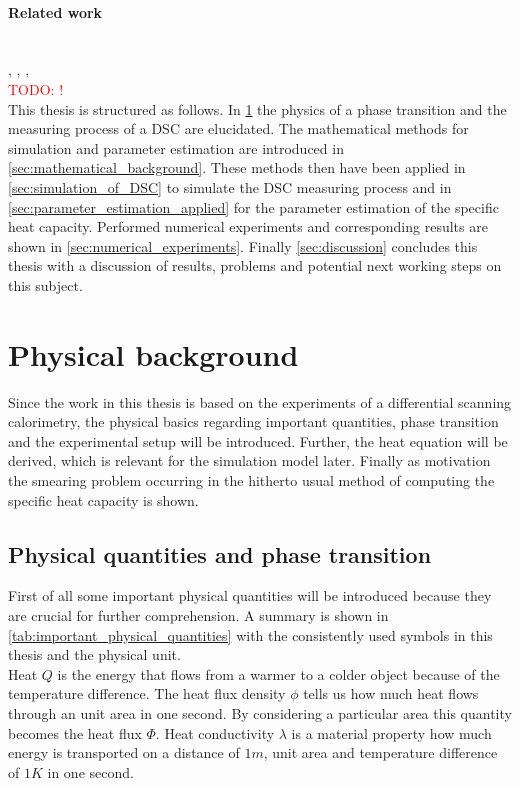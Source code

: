 \documentclass{scrartcl}[12pt, halfparskip]
\numberwithin{equation}{section}
\numberwithin{figure}{section}
\numberwithin{table}{section}
\newcommand{\todo}[1]{\textcolor{red}{TODO: #1}}
\begin{document}
\paragraph{Related work} \mbox{}\\
\cite{wunderlich_thermal_analysis}, \cite{standardization_of_PCM}, 
\cite{diss_DSC}, \cite{fokker_planck_desmearing_asommer} \\

\todo{!} \\

This thesis is structured as follows. In \cref{sec:physical_background} the physics of a phase transition and the measuring process of a DSC are elucidated. 
The mathematical methods for simulation and parameter estimation are introduced in \cref{sec:mathematical_background}. These methods then have been applied in \cref{sec:simulation_of_DSC} to simulate the DSC measuring process and in \cref{sec:parameter_estimation_applied} for the parameter estimation of the specific heat capacity. Performed numerical experiments and corresponding results are shown in \cref{sec:numerical_experiments}. Finally \cref{sec:discussion} concludes this thesis with a discussion of results, problems and potential next working steps on this subject.


\section{Physical background}
\label{sec:physical_background}

Since the work in this thesis is based on the experiments of a differential scanning calorimetry, the physical basics regarding important quantities, phase transition and the experimental setup will be introduced. Further, the heat equation will be derived, which is relevant for the simulation model later. Finally as motivation the smearing problem occurring in the hitherto usual method of computing the specific heat capacity is shown.


\subsection{Physical quantities and phase transition}

First of all some important physical quantities will be introduced because they are crucial for further comprehension. A summary is shown in \cref{tab:important_physical_quantities} with the consistently used symbols in this thesis and the physical unit. \\
Heat $Q$ is the energy that flows from a warmer to a colder object because of the temperature difference. The heat flux density $\phi$ tells us how much heat flows through an unit area in one second. By considering a particular area this quantity becomes the heat flux $\varPhi$. Heat conductivity $\lambda$ is a material property how much energy is transported on a distance of $1m$, unit area and temperature difference of $1K$ in one second.
\end{document}
